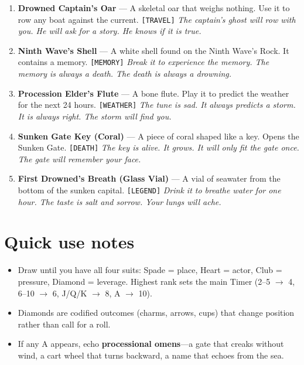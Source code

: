 \begin{enumerate}
  \hfill \textit{The sandal will not get wet. Your foot will. The water is cold.}
\item {} \textbf{Drowned Captain's Oar} --- A skeletal oar that weighs nothing. Use it to row any boat against the current. \texttt{[TRAVEL]}
  \hfill \textit{The captain's ghost will row with you. He will ask for a story. He knows if it is true.}
\item {} \textbf{Ninth Wave's Shell} --- A white shell found on the Ninth Wave's Rock. It contains a memory. \texttt{[MEMORY]}
  \hfill \textit{Break it to experience the memory. The memory is always a death. The death is always a drowning.}
\item {} \textbf{Procession Elder's Flute} --- A bone flute. Play it to predict the weather for the next 24 hours. \texttt{[WEATHER]}
  \hfill \textit{The tune is sad. It always predicts a storm. It is always right. The storm will find you.}
\item {} \textbf{Sunken Gate Key (Coral)} --- A piece of coral shaped like a key. Opens the Sunken Gate. \texttt{[DEATH]}
  \hfill \textit{The key is alive. It grows. It will only fit the gate once. The gate will remember your face.}
\item {} \textbf{First Drowned's Breath (Glass Vial)} --- A vial of seawater from the bottom of the sunken capital. \texttt{[LEGEND]}
  \hfill \textit{Drink it to breathe water for one hour. The taste is salt and sorrow. Your lungs will ache.}
\end{enumerate}

\section*{Quick use notes}
\label{sec:lethai-al-quick-use}
\begin{itemize}
\item Draw until you have all four suits: Spade = place, Heart = actor, Club = pressure, Diamond = leverage. Highest rank sets the main Timer (2--5 $\rightarrow$ 4, 6--10 $\rightarrow$ 6, J/Q/K $\rightarrow$ 8, A $\rightarrow$ 10).
\item Diamonds are codified outcomes (charms, arrows, cups) that change position rather than call for a roll.
\item If any A appears, echo \textbf{processional omens}---a gate that creaks without wind, a cart wheel that turns backward, a name that echoes from the sea.
\end{itemize}

